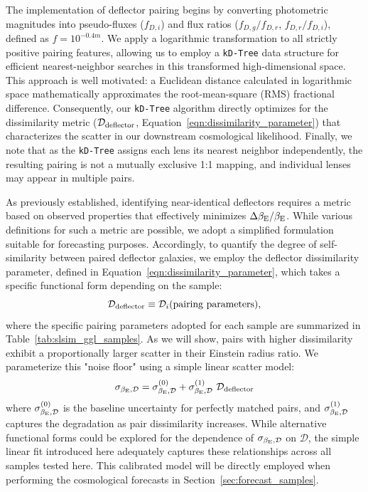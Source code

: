\documentclass[a4paper,11pt]{article}
\begin{document}
The implementation of deflector pairing begins by converting photometric magnitudes into pseudo-fluxes ($f_{D,i}$) and flux ratios ($f_{D,g}/f_{D,r}$, $f_{D,r}/f_{D,i}$), defined as $f = 10^{-0.4m}$. We apply a logarithmic transformation to all strictly positive pairing features, allowing us to employ a \texttt{kD-Tree} data structure \citep{2020SciPy} for efficient nearest-neighbor searches in this transformed high-dimensional space. This approach is well motivated: a Euclidean distance calculated in logarithmic space mathematically approximates the root-mean-square (RMS) fractional difference. Consequently, our \texttt{kD-Tree} algorithm directly optimizes for the dissimilarity metric ($\mathcal{D}_{\rm deflector}$, Equation~\ref{eqn:dissimilarity_parameter}) that characterizes the scatter in our downstream cosmological likelihood. Finally, we note that as the \texttt{kD-Tree} assigns each lens its nearest neighbor independently, the resulting pairing is not a mutually exclusive 1:1 mapping, and individual lenses may appear in multiple pairs.

As previously established, identifying near-identical deflectors requires a metric based on observed properties that effectively minimizes $\Delta\beta_{\rm E}/\beta_{\rm E}$. While various definitions for such a metric are possible, we adopt a simplified formulation suitable for forecasting purposes. Accordingly, to quantify the degree of self-similarity between paired deflector galaxies, we employ the deflector dissimilarity parameter, defined in Equation~\ref{eqn:dissimilarity_parameter}, which takes a specific functional form depending on the sample:
\begin{equation}\label{eqn:dissmilarity_parameter_diff_samples}
\mathcal{D}_{\rm deflector} \equiv \mathcal{D}_i(\text{pairing parameters}),
\end{equation}
where the specific pairing parameters adopted for each sample are summarized in Table~\ref{tab:slsim_ggl_samples}. As we will show, pairs with higher dissimilarity exhibit a proportionally larger scatter in their Einstein radius ratio. We parameterize this "noise floor" using a simple linear scatter model:
\begin{equation}\label{eqn:model_beta_E_dissimilarity}
    \sigma_{\beta_{\rm E}, \mathcal{D}} = \sigma_{\beta_{\rm E},\rm \mathcal{D}}^{(0)} + \sigma_{\beta_{\rm E},\rm \mathcal{D}}^{(1)} \ \mathcal{D}_{\rm deflector}
\end{equation}
where $\sigma_{\beta_{\rm E},\rm \mathcal{D}}^{(0)}$ is the baseline uncertainty for perfectly matched pairs, and $\sigma_{\beta_{\rm E},\rm \mathcal{D}}^{(1)}$ captures the degradation as pair dissimilarity increases. While alternative functional forms could be explored for the dependence of $\sigma_{\beta_{\rm E}, \mathcal{D}}$ on $\mathcal{D}$, the simple linear fit introduced here adequately captures these relationships across all samples tested here. This calibrated model will be directly employed when performing the cosmological forecasts in Section~\ref{sec:forecast_samples}.
\end{document}
